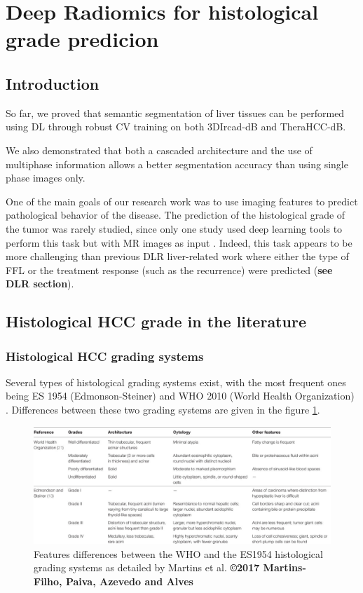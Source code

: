 \documentclass[]{article}
\newcommand{\lmttfont}[1]{{\fontfamily{lmtt}\selectfont #1}}
\begin{document}
\section{Deep Radiomics for histological grade predicion}

\subsection{Introduction}\label{introduction}

So far, we proved that semantic segmentation of liver tissues can be
performed using DL through robust CV training on both \lmttfont{3DIrcad-dB} and
\lmttfont{TheraHCC-dB}.

We also demonstrated that both a cascaded architecture and the use of
multiphase information allows a better segmentation accuracy than using
single phase images only.

One of the main goals of our research work was to use imaging features
to predict pathological behavior of the disease. The prediction of the
histological grade of the tumor was rarely studied, since only one study
used deep learning tools to perform this task but with MR images as
input \cite{Yang2019}.
Indeed, this task appears to be more challenging than previous DLR
liver-related work where either the type of FFL or the treatment
response (such as the recurrence) were predicted (\textbf{see DLR section}).

\subsection{Histological HCC grade in the literature
}\label{histological-hcc-grade-in-the-literature}

\subsubsection{Histological HCC grading
systems}\label{histological-hcc-grading-systems}

Several types of histological grading systems exist, with the most
frequent ones being ES 1954 (Edmonson-Steiner) \cite{EdmondsonHA1954}
and WHO 2010 (World Health Organization) \cite{20113051318}. Differences between these two
grading systems are given in the figure \ref{fig:martins2017_table1}.

\begin{figure}[th!]
\centering
\includegraphics[width=0.9\linewidth]{images/martins2017_table1}
\caption{Features differences between the WHO and the ES1954 histological grading systems as detailed by Martins et al. \cite{Martins2017} \textbf{©2017 Martins-Filho, Paiva, Azevedo and Alves}}
\label{fig:martins2017_table1}
\end{figure}
\end{document}
